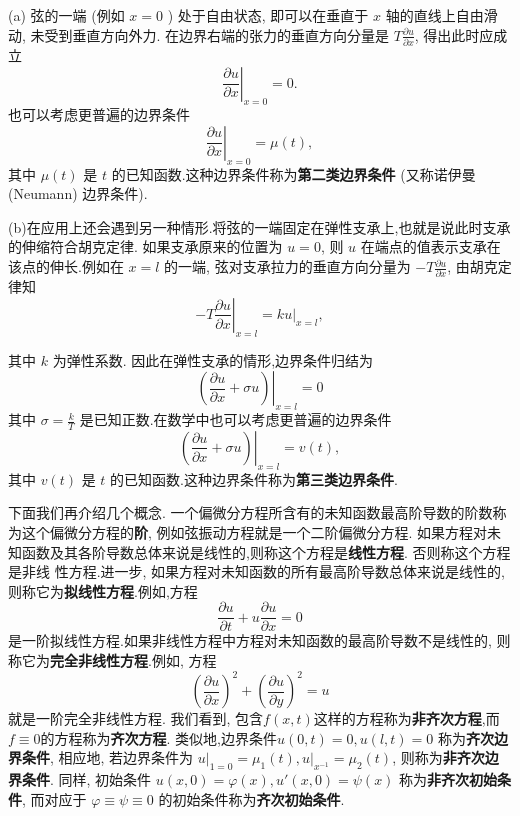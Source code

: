 (a) 弦的一端 (例如 $x=0$ ) 处于自由状态, 即可以在垂直于 $x$ 轴的直线上自由滑动, 未受到垂直方向外力.
在边界右端的张力的垂直方向分量是 $T \frac{\partial u}{\partial x}$, 得出此时应成立
$$
\left.\frac{\partial u}{\partial x}\right|_{x=0}=0 .
$$
也可以考虑更普遍的边界条件
$$
\left.\frac{\partial u}{\partial x}\right|_{x=0}=\mu(t) ,
$$
其中 $\mu(t)$ 是 $t$ 的已知函数.这种边界条件称为\textbf{第二类边界条件} (又称诺伊曼 (Neumann) 边界条件).

(b)在应用上还会遇到另一种情形.将弦的一端固定在弹性支承上,也就是说此时支承的伸缩符合胡克定律. 
如果支承原来的位置为 $u=0$, 则 $u$ 在端点的值表示支承在该点的伸长.例如在 $x=l$ 的一端, 
弦对支承拉力的垂直方向分量为 $-T \frac{\partial u}{\partial x}$, 由胡克定律知
$$
-\left.T \frac{\partial u}{\partial x}\right|_{x=l}=\left.k u\right|_{x=l},
$$

其中 $k$ 为弹性系数. 因此在弹性支承的情形,边界条件归结为
$$
\left.\left(\frac{\partial u}{\partial x}+\sigma u\right)\right|_{x=l}=0
$$
其中 $\sigma=\frac{k}{T}$ 是已知正数.在数学中也可以考虑更普遍的边界条件
$$
\left.\left(\frac{\partial u}{\partial x}+\sigma u\right)\right|_{x=l}=v(t),
$$
其中 $v(t)$ 是 $t$ 的已知函数.这种边界条件称为\textbf{第三类边界条件}.

下面我们再介绍几个概念. 一个偏微分方程所含有的未知函数最高阶导数的阶数称为这个偏微分方程的\textbf{阶}, 例如弦振动方程就是一个二阶偏微分方程.
如果方程对未知函数及其各阶导数总体来说是线性的,则称这个方程是\textbf{线性方程}. 否则称这个方程是非线
性方程.进一步, 如果方程对未知函数的所有最高阶导数总体来说是线性的, 则称它为\textbf{拟线性方程}.例如,方程
$$
\frac{\partial u}{\partial t}+u \frac{\partial u}{\partial x}=0
$$
是一阶拟线性方程.如果非线性方程中方程对未知函数的最高阶导数不是线性的, 则称它为\textbf{完全非线性方程}.例如, 方程
$$
\left(\frac{\partial u}{\partial x}\right)^2+\left(\frac{\partial u}{\partial y}\right)^2=u
$$
就是一阶完全非线性方程.
我们看到, 包含$f(x, t)$这样的方程称为\textbf{非齐次方程},而 $f\equiv 0$的方程称为\textbf{齐次方程}.
类似地,边界条件$u(0,t) = 0, u(l, t) = 0$ 称为\textbf{齐次边界条件},
相应地, 若边界条件为 $\left.u\right|_{1=0}=\mu_1(t),\left.u\right|_{x^{-1}}=\mu_2(t)$, 则称为\textbf{非齐次边界条件}.
同样, 初始条件 $u(x, 0) = \varphi(x), u'(x, 0) = \psi(x)$ 称为\textbf{非齐次初始条件}, 
而对应于 $\varphi \equiv \psi \equiv 0$ 的初始条件称为\textbf{齐次初始条件}.


